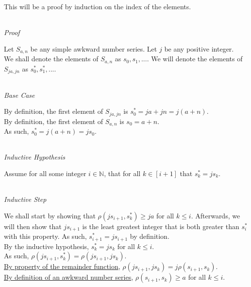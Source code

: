 \documentclass[a4paper,12pt]{article}
\begin{document}
\noindent This will be a proof by induction on the index of the elements.

\noindent \\
\textit{Proof}

\noindent Let $S_{a,n}$ be any simple awkward number series. Let $j$ be any positive integer.\\

\noindent We shall denote the elements of $S_{a,n}$ as $s_0, s_1, ...$. We will denote the elements of $S_{ja, jn}$ as $s^*_0, s^*_1, ...$.

\noindent \\
\textit{Base Case}

\noindent By definition, the first element of $S_{ja, jn}$ is $s^*_0 = ja + jn = j(a + n)$.\\

\noindent By definition, the first element of $S_{a,n}$ is $s_0 = a + n$.\\

\noindent As such, $s^*_0 = j(a + n) = js_0$.



\noindent \\
\textit{Inductive Hypothesis}

\noindent Assume for all some integer $i \in \mathbb{N}$, that for all $k \in [i + 1]$ that $s^*_k = js_k$.


\noindent \\
\textit{Inductive Step}

\noindent We shall start by showing that $\rho(js_{i+1}, s^*_k) \geq ja$ for all $k \leq i$. Afterwards, we will then show that $js_{i+1}$ is the least greatest integer that is both greater than $s^*_i$ with this property. As such, $s^*_{i+1} = js_{i+1}$ by definition.\\

\noindent By the inductive hypothesis, $s^*_k = js_k$ for all $k \leq i$.\\

\noindent As such, $\rho(js_{i+1}, s^*_k) = \rho(js_{i+1}, js_k)$.\\

\noindent \hyperlink{remainder_properties}{By property of the remainder function}, $\rho(js_{i+1}, js_k) = j \rho(s_{i+1}, s_k)$.\\

\noindent \hyperlink{definition:awkward_number_series}{By definition of an awkward number series}, $\rho(s_{i+1}, s_k) \geq a$ for all $k \leq i$.\\
\end{document}
